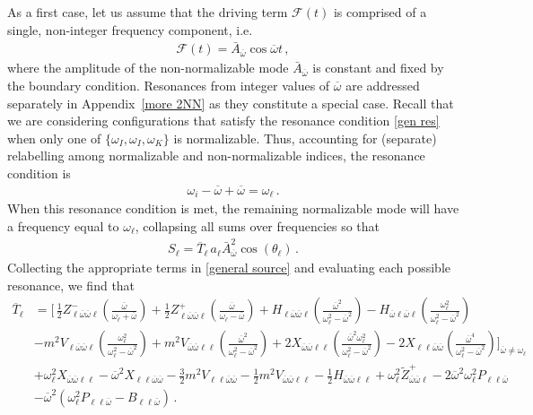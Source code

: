 \documentclass[letterpaper,11pt]{article}
\newcommand{\oi}{\omega_i}
\newcommand{\ol}{\omega_\ell}
\newcommand{\thl}{\theta_\ell}
\newcommand{\mc}{\mathcal}
\newcommand{\ob}{\overline{\omega}}
\begin{document}
As a first case, let us assume that the driving term $\mc F(t)$ is comprised of a single, non-integer frequency component, i.e.~
\begin{align}
\mc F(t) = \bar A_{\ob}\cos \ob t \, ,
\end{align}
where the amplitude of the non-normalizable mode $\bar A_{\ob}$ is constant and fixed by the boundary condition. Resonances from integer values of $\ob$ are addressed separately in Appendix~\ref{more 2NN} as they constitute a special case. Recall that we are considering configurations that satisfy the resonance condition \eqref{gen res} when only one of $\{\omega_I, \omega_I, \omega_K \}$ is normalizable. Thus, accounting for (separate) relabelling among normalizable and non-normalizable indices, the resonance condition is
\begin{align}
\label{gen nn}
\oi - \ob + \ob = \ol \, .
\end{align}
When this resonance condition is met, the remaining normalizable mode will have a frequency equal to $\ol$, collapsing all sums over frequencies so that
\begin{align}
\label{2genNN}
S_\ell = \overline{T}_{\ell} \, a_\ell \bar A_{\ob}^2 \cos (\thl) \, .
\end{align}
 Collecting the appropriate terms in \eqref{general source} and evaluating each possible resonance, we find that
\begin{align}
\label{S:2NN}
\overline{T}_{\ell} &=  \bigg[ \, \frac{1}{2} Z^-_{\ell\ob\ob\ell} \left( \frac{\ob}{\ol + \ob} \right) + \frac{1}{2} Z^+_{\ell\ob\ob\ell} \left( \frac{\ob}{\ol - \ob} \right)  + H_{\ell \ob \ob \ell} \left( \frac{\ob^2}{\ol^2 - \ob^2} \right)  - H_{\ob\ell\ob\ell} \left(\frac{\ol^2}{\ol^2 - \ob^2} \right) \nonumber \\
%
& - m^2 V_{\ell \ob\ob\ell}  \left(\frac{\ol^2}{\ol^2 - \ob^2} \right) + m^2 V_{\ob\ob\ell\ell} \left( \frac{\ob^2}{\ol^2 - \ob^2} \right) + 2 X_{\ob\ob\ell\ell} \left( \frac{\ob^2 \ol^2}{\ol^2 - \ob^2} \right) - 2 X_{\ell\ell\ob\ob} \left( \frac{\ob^4}{\ol^2 - \ob^2} \right) \bigg]_{\ob \neq \ol} \nonumber \\
%
&  + \ol^2 X_{\ob\ob\ell\ell}  - \ob^2 X_{\ell\ell\ob\ob} - \frac{3}{2} m^2 V_{\ell\ell\ob\ob} - \frac{1}{2} m^2 V_{\ob\ob\ell\ell}  - \frac{1}{2} H_{\ob\ob\ell\ell} + \ol^2 \tilde{Z}^+_{\ob\ob\ell} - 2 \ob^2 \ol^2 P_{\ell\ell\ob} \nonumber \\
%
& - \ob^2 \left( \ol^2 P_{\ell\ell \ob} - B_{\ell\ell\ob} \right) \, .
\end{align}
\end{document}
